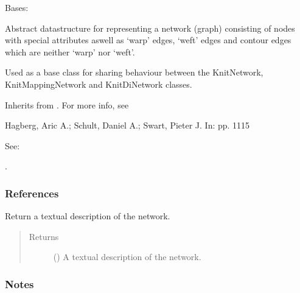 \documentclass[letterpaper,10pt,english]{sphinxmanual}
\begin{document}
\begin{fulllineitems}
\label{\detokenize{cockatoo:cockatoo.KnitNetworkBase}}
Bases: 

Abstract datastructure for representing a network (graph) consisting of
nodes with special attributes aswell as ‘warp’ edges, ‘weft’ edges and
contour edges which are neither ‘warp’ nor ‘weft’.

Used as a base class for sharing behaviour between the KnitNetwork,
KnitMappingNetwork and KnitDiNetwork classes.

Inherits from .
For more info, see  %
\begin{footnote}[13]\sphinxAtStartFootnote
Hagberg, Aric A.; Schult, Daniel A.; Swart, Pieter J.
 In:  pp. 11\sphinxhyphen{}15

See: 
%
\end{footnote}.
\subsubsection*{References}

\begin{fulllineitems}
\label{\detokenize{cockatoo:cockatoo.KnitNetworkBase.ToString}}
Return a textual description of the network.
\begin{quote}\begin{description}
\item[{Returns}] \leavevmode
{} () \textendash{} A textual description of the network.

\end{description}\end{quote}
\subsubsection*{Notes}


\end{fulllineitems}
\end{fulllineitems}
\end{document}
